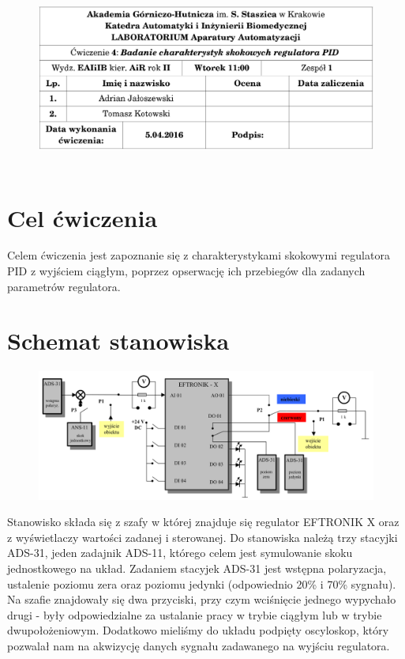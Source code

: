 \documentclass[a4paper, 12pt]{article}
\begin{document}
	\begin{figure}[H]
		\centering
		\includegraphics[height=6cm, width=\textwidth]{./grafika/lena.png}
	\end{figure}
	\section{Cel ćwiczenia}
		Celem ćwiczenia jest zapoznanie się z charakterystykami skokowymi regulatora PID z wyjściem ciągłym, poprzez opserwację ich przebiegów dla zadanych parametrów regulatora.
	\section{Schemat stanowiska}
		\begin{figure}[H]
			\centering
			\includegraphics[width=\textwidth]{./grafika/schemat.png}
		\end{figure}
		Stanowisko składa się z szafy w której znajduje się regulator EFTRONIK X oraz z wyświetlaczy wartości zadanej i sterowanej. Do stanowiska należą trzy stacyjki ADS-31, jeden zadajnik \linebreak ADS-11, którego celem jest symulowanie skoku jednostkowego na układ. Zadaniem stacyjek ADS-31 jest wstępna polaryzacja, ustalenie poziomu zera oraz poziomu jedynki (odpowiednio 20\% i 70\% sygnału). Na szafie znajdowały się dwa przyciski, przy czym wciśnięcie jednego wypychało drugi - były odpowiedzialne za ustalanie pracy w trybie ciągłym lub w trybie dwupołożeniowym. Dodatkowo mieliśmy do układu podpięty oscyloskop, który pozwalał nam na akwizycję danych sygnału zadawanego na wyjściu regulatora.
\end{document}
